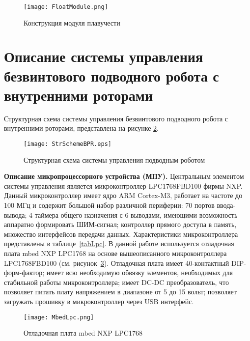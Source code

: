 \begin{figure}[h]
	\centering
	\texttt{[image: FloatModule.png]}%
	\caption{Конструкция модуля плавучести}
	\label{FloatModule}
\end{figure}




\section{Описание системы управления безвинтового подводного робота с внутренними роторами}

Структурная схема системы управления безвинтового подводного робота с внутренними роторами, представлена на рисунке \ref{str_scheme}.

\begin{figure}[h!]
	\begin{center}
		\texttt{[image: StrSchemeBPR.eps]}
		\caption{Структурная схема системы управления подводным роботом} \label{str_scheme}
	\end{center}
\end{figure}


\textbf{Описание микропроцессорного устройства (МПУ).} Центральным элементом системы управления является микроконтроллер LPC1768FBD100 фирмы NXP. Данный микроконтроллер имеет ядро ARM Cortex-M3, работает на частоте до 100 МГц и содержит большой набор различной периферии: 70 портов ввода-вывода; 4 таймера общего назначения с 6 выводами, имеющими возможность аппаратно формировать ШИМ-сигнал; контроллер прямого доступа в память, множество интерфейсов передачи данных. Характеристики микроконтроллера представлены в таблице~\ref{tabLpc}. В данной работе используется отладочная плата mbed NXP LPC1768 на основе вышеописанного микроконтроллера LPC1768FBD100 (см. рисунок~\ref{MbedLpc}).  Отладочная плата имеет 40-контактный DIP-форм-фактор; имеет всю необходимую обвязку элементов, необходимых для стабильной работы микроконтроллера; имеет DC-DC преобразователь, что позволяет питать плату напряжением в диапазоне от 5 до 15 вольт; позволяет загружать прошивку в микроконтроллер через USB интерфейс.

\begin{figure}[h]
	\centering
	\texttt{[image: MbedLpc.png]}%
	\caption{Отладочная плата mbed NXP LPC1768}
	\label{MbedLpc}
\end{figure}

